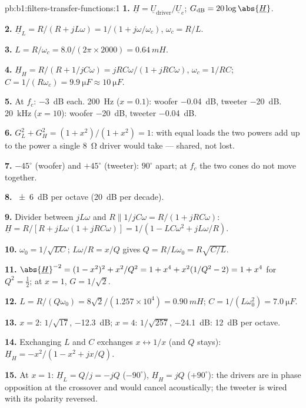 \begin{solution}{pb:b1:filters-transfer-functions:1}
\textbf{1.} $\underline H = \underline U_{\text{driver}}/\underline U_e$;
$G_{\mathrm{dB}} = 20\log\abs{\underline H}$.

\textbf{2.} $\underline H_L = R/(R + jL\omega) = 1/(1 + j\omega/\omega_c)$,
$\omega_c = R/L$.

\textbf{3.} $L = R/\omega_c = 8.0/(2\pi \times 2000) = \qty{0.64}{mH}$.

\textbf{4.} $\underline H_H = R/(R + 1/jC\omega) = jRC\omega/(1 + jRC\omega)$,
$\omega_c = 1/RC$; $C = 1/(R\omega_c) = \qty{9.9}{\micro F} \approx
\qty{10}{\micro F}$.

\textbf{5.} At $f_c$: \qty{-3}{dB} each. \qty{200}{Hz} ($x = 0.1$): woofer
\qty{-0.04}{dB}, tweeter \qty{-20}{dB}. \qty{20}{kHz} ($x = 10$): woofer
\qty{-20}{dB}, tweeter \qty{-0.04}{dB}.

\textbf{6.} $G_L^2 + G_H^2 = (1 + x^2)/(1 + x^2) = 1$: with equal loads
the two powers add up to the power a single \qty{8}{\ohm} driver would
take --- shared, not lost.

\textbf{7.} $-45^\circ$ (woofer) and $+45^\circ$ (tweeter): $90^\circ$
apart; at $f_c$ the two cones do not move together.

\textbf{8.} \qty{\pm 6}{dB} per octave (\qty{20}{dB} per decade).

\textbf{9.} Divider between $jL\omega$ and $R \parallel 1/jC\omega =
R/(1 + jRC\omega)$: $\underline H = R/[R + jL\omega(1 + jRC\omega)] =
1/(1 - LC\omega^2 + jL\omega/R)$.

\textbf{10.} $\omega_0 = 1/\sqrt{LC}$; $L\omega/R = x/Q$ gives $Q =
R/L\omega_0 = R\sqrt{C/L}$.

\textbf{11.} $\abs{\underline H}^{-2} = (1 - x^2)^2 + x^2/Q^2 = 1 + x^4 +
x^2(1/Q^2 - 2) = 1 + x^4$ for $Q^2 = \tfrac12$; at $x = 1$, $G = 1/\sqrt2$.

\textbf{12.} $L = R/(Q\omega_0) = 8\sqrt2/(1.257\times10^4) = \qty{0.90}{mH}$;
$C = 1/(L\omega_0^2) = \qty{7.0}{\micro F}$.

\textbf{13.} $x = 2$: $1/\sqrt{17}$, \qty{-12.3}{dB}; $x = 4$: $1/\sqrt{257}$,
\qty{-24.1}{dB}: \qty{12}{dB} per octave.

\textbf{14.} Exchanging $L$ and $C$ exchanges $x \leftrightarrow 1/x$ (and
$Q$ stays): $\underline H_H = -x^2/(1 - x^2 + jx/Q)$.

\textbf{15.} At $x = 1$: $\underline H_L = Q/j = -jQ$ ($-90^\circ$),
$\underline H_H = jQ$ ($+90^\circ$): the drivers are in phase
opposition at the crossover and would cancel acoustically; the tweeter
is wired with its polarity reversed.


\end{solution}
